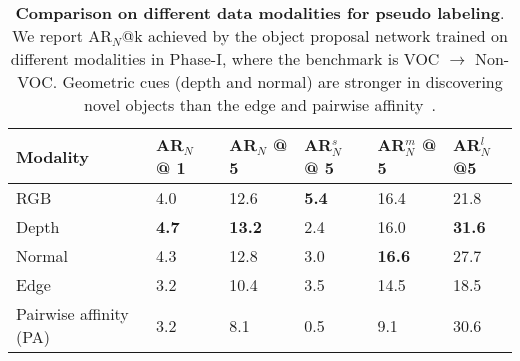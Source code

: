\documentclass{article} \usepackage{iclr2023_conference,times}
\begin{document}
\begin{table*}[!t]
					\begin{tabular}{l|l|l|l|l|l}
						\toprule
						Modality & AR$_N$ @ 1 &   AR$_N$ @ 5      & AR$_N^s$ @ 5 &  AR$_N^m$ @ 5 & AR$_N^l$@5    \\ \midrule
                             RGB & 4.0&		12.6& \textbf{5.4} & 16.4 & 21.8	 \\
 Depth & \textbf{4.7}&		\textbf{13.2}&	2.4 & 16.0 & \textbf{31.6}	\\
Normal &4.3&		12.8&	3.0 & \textbf{16.6} & 27.7	\\
Edge & 3.2&		10.4& 3.5 & 14.5 & 18.5	 \\
                    Pairwise affinity (PA) & 3.2 & 8.1 & 0.5 & 9.1 & 30.6
                             \\
                    \bottomrule
						\end{tabular}
	\caption{\textbf{Comparison on different data modalities for pseudo labeling}. We report AR$_N$@k achieved by the object proposal network trained on different modalities in Phase-I, where the benchmark is VOC $\rightarrow$ Non-VOC. Geometric cues (depth and normal) are stronger in discovering novel objects than the edge and pairwise affinity~\citep{wang2022open}.}
	\label{table:comparison_pseudo_box}
\end{table*}
 
\end{document}
